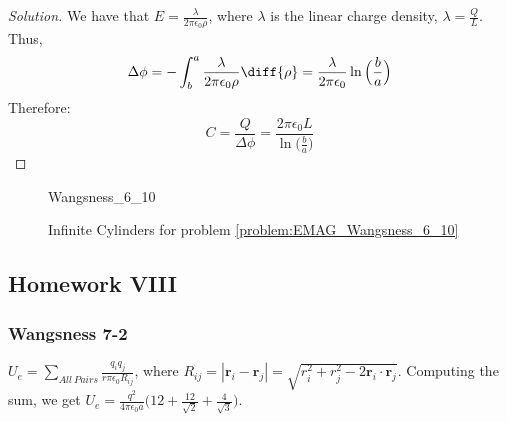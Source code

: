 \documentclass[crop=false,class=book,oneside]{standalone}
\begin{document}
            \begin{proof}[Solution]
                We have that
                $E=\frac{\lambda}{2\pi \epsilon_0 \rho}$,
                where $\lambda$
                is the linear charge density,
                $\lambda=\frac{Q}{L}$.
                Thus,
                \begin{equation*}
                    \Delta\phi=-\int_{b}^{a}
                    \frac{\lambda}{2\pi\epsilon_0\rho}\diff{\rho}
                    =\frac{\lambda}{2\pi\epsilon_{0}}
                    \ln\Big(\frac{b}{a}\Big)    
                \end{equation*}
                Therefore:
                \begin{equation*}
                    C=\frac{Q}{\Delta\phi}
                    =\frac{2\pi\epsilon_{0}L}
                          {\ln\big(\frac{b}{a}\big)}
                \end{equation*}
            \end{proof}
            \begin{figure}[H]
                \centering
                \captionsetup{type=figure}
                {Wangsness_6_10}
                \caption{%
                    Infinite Cylinders for problem
                    \ref{problem:EMAG_Wangsness_6_10}
                }
                \label{fig:EMAG_Wangsness_6_10}
            \end{figure}
        \subsection{Homework VIII}
            \subsubsection{Wangsness 7-2}
                $U_e=\underset{All\ Pairs}\sum\frac{q_i q_j}{r\pi\epsilon_0 R_{ij}}$,
                where $R_{ij}=|\mathbf{r}_i-\mathbf{r}_j|=\sqrt{r_i^2+r_j^2 -2\mathbf{r}_i\cdot \mathbf{r}_j}$.
                Computing the sum, we get
                $U_e=\frac{q^2}{4\pi\epsilon_0 a}\big(12+\frac{12}{\sqrt{2}}+\frac{4}{\sqrt{3}}\big)$.
\end{document}
